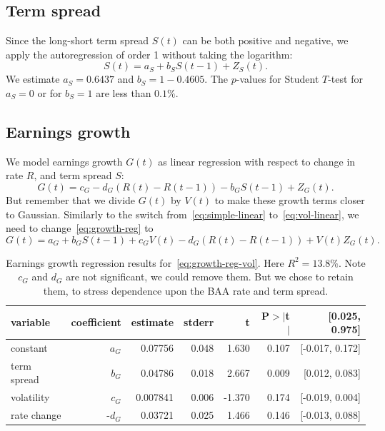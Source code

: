 \documentclass[12pt]{amsart}
\begin{document}
\subsection{Term spread} Since the long-short term spread $S(t)$ can be both positive and negative, we apply the autoregression of order 1 without taking the logarithm:
\begin{equation}
\label{eq:spread}
S(t) = a_S + b_SS(t-1) + Z_S(t).
\end{equation}
We estimate $a_S = 0.6437$ and $b_S = 1 - 0.4605$. The $p$-values for Student $T$-test for $a_S = 0$ or for $b_S = 1$ are less than $0.1\%$. 

\subsection{Earnings growth} We model earnings growth $G(t)$ as linear regression with respect to change in rate $R$, and term spread $S$:
\begin{equation}
\label{eq:growth-reg}
G(t) = c_G - d_G(R(t) - R(t-1)) - b_GS(t-1) + Z_G(t).
\end{equation}
But remember that we divide $G(t)$ by $V(t)$ to make these growth terms closer to Gaussian. Similarly to the switch from~\eqref{eq:simple-linear} to~\eqref{eq:vol-linear}, we need to change~\eqref{eq:growth-reg} to
\begin{equation}
\label{eq:growth-reg-vol}
G(t) = a_G + b_GS(t-1) + c_GV(t) - d_G(R(t) - R(t-1)) + V(t)Z_G(t). 
\end{equation}

\begin{table}[h]
\centering
\begin{tabular}{lrrrrrr}
\hline
\textbf{variable} & \textbf{coefficient}  & \textbf{estimate} & \textbf{stderr} & \textbf{t} & \textbf{P$>\vert$t$\vert$} & \textbf{[0.025, 0.975]} \\
\hline
constant & $a_G$ & 0.07756  & 0.048 & 1.630  & 0.107 & [-0.017, 0.172] \\
term spread & $b_G$ & 0.04786  & 0.018 & 2.667  & 0.009 & [0.012, 0.083] \\
volatility & $c_G$   & 0.007841 & 0.006 & -1.370 & 0.174 & [-0.019, 0.004] \\
rate change  & -$d_G$ & 0.03721 & 0.025 & 1.466  & 0.146 & [-0.013, 0.088] \\
\hline
\end{tabular}
\caption{Earnings growth regression results for~\eqref{eq:growth-reg-vol}. Here $R^2 = 13.8\%$. Note $c_G$ and $d_G$ are not significant, we could remove them. But we chose to retain them, to stress dependence upon the BAA rate and term spread.}
\label{table:regression-earnings}
\end{table}
\end{document}
